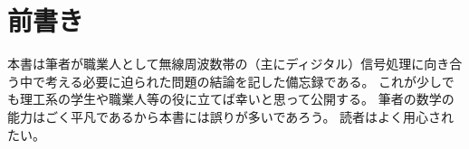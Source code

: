 \part{前書き}
    本書は筆者が職業人として無線周波数帯の（主にディジタル）信号処理に向き合う中で考える必要に迫られた問題の結論を記した備忘録である。
    これが少しでも理工系の学生や職業人等の役に立てば幸いと思って公開する。
    筆者の数学の能力はごく平凡であるから本書には誤りが多いであろう。
    読者はよく用心されたい。
